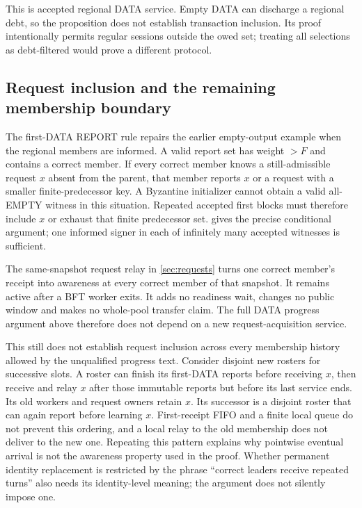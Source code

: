 This is accepted regional DATA service. Empty DATA can discharge a
regional debt, so the proposition does not establish transaction
inclusion. Its proof intentionally permits regular sessions outside
the owed set; treating all selections as debt-filtered would prove a
different protocol.

\subsection{Request inclusion and the remaining membership boundary}
\label{sec:v35-request-limit}
The first-DATA REPORT rule repairs the earlier empty-output example
when the regional members are informed. A valid report set has weight
$>F$ and contains a correct member. If every correct member knows a
still-admissible request $x$ absent from the parent, that member reports
$x$ or a request with a smaller finite-predecessor key. A Byzantine
initializer cannot obtain a valid all-EMPTY witness in this situation.
Repeated accepted first blocks must therefore include $x$ or exhaust
that finite predecessor set.  gives the
precise conditional argument; one informed signer in each of infinitely
many accepted witnesses is sufficient.

The same-snapshot request relay in \cref{sec:requests} turns one correct
member's receipt into awareness at every correct member of that snapshot.
It remains active after a BFT worker exits. It adds no readiness wait,
changes no public window and makes no whole-pool transfer claim. The
full DATA progress argument above therefore does not depend on a new
request-acquisition service.

This still does not establish request inclusion across every membership
history allowed by the unqualified progress text. Consider disjoint new
rosters for successive slots. A roster can finish its first-DATA reports
before receiving $x$, then receive and relay $x$ after those immutable
reports but before its last service ends. Its old workers and request
owners retain $x$. Its successor is a disjoint roster that can again
report before learning $x$. First-receipt FIFO and a finite local queue
do not prevent this ordering, and a local relay to the old membership
does not deliver to the new one. Repeating this pattern explains why
pointwise eventual arrival is not the awareness property used in the
proof. Whether permanent identity replacement is restricted by the
phrase ``correct leaders receive repeated turns'' also needs its
identity-level meaning; the argument does not silently impose one.


